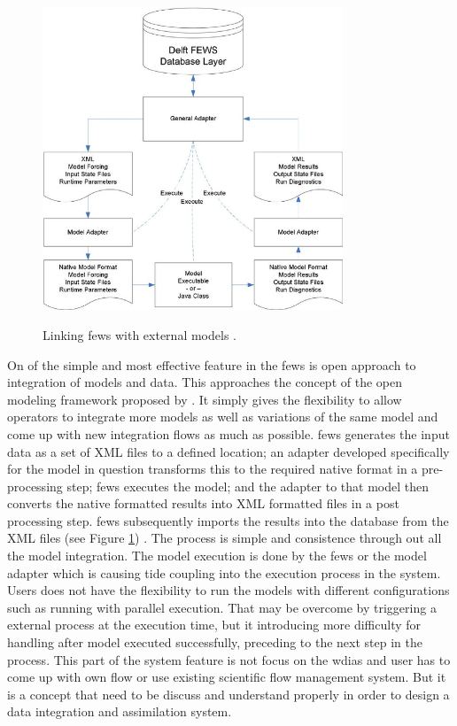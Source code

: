 \begin{figure}[htp]
    \centering
    \includegraphics[width=0.8\textwidth]{fews/Linking-Delft-FEWS-with-external-models-The-fi-gure-shows-the-fl-ow-of-data-through-XML_W640.jpg}\\
    \caption[Linking \acrshort{fews} with external models]{Linking \acrshort{fews} with external models \cite{Werner2013TheSystem}.}
    \label{fi:fews_general_adapter}
\end{figure}
On of the simple and most effective feature in the \acrshort{fews} is open approach to integration of models and data. This approaches the concept of the open modeling framework proposed by \cite{Kokkonen2003InterfacingXML}. It simply gives the flexibility to allow operators to integrate more models as well as variations of the same model and come up with new integration flows as much as possible.
\acrshort{fews} generates the input data as a set of XML files to a defined location; an adapter developed specifically for the model in question transforms this to the required native format in a pre-processing step; \acrshort{fews} executes the model; and the adapter to that model then converts the native formatted results into XML formatted files in a post processing step. \acrshort{fews} subsequently imports the results into the database from the XML files (see Figure \ref{fi:fews_general_adapter}) \cite{Werner2013TheSystem}. The process is simple and consistence through out all the model integration. The model execution is done by the \acrshort{fews} or the model adapter which is causing tide coupling into the execution process in the system. Users does not have the flexibility to run the models with different configurations such as running with parallel execution. That may be overcome by triggering a external process at the execution time, but it introducing more difficulty for handling after model executed successfully, preceding to the next step in the process. This part of the system feature is not focus on the \acrshort{wdias} and user has to come up with own flow or use existing scientific flow management system. But it is a concept that need to be discuss and understand properly in order to design a data integration and assimilation system.

